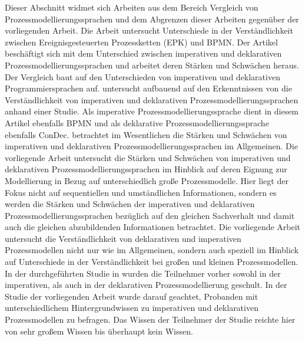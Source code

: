 Dieser Abschnitt widmet sich Arbeiten aus dem Bereich Vergleich von Prozessmodellierungssprachen und dem Abgrenzen dieser Arbeiten gegenüber der vorliegenden Arbeit.
Die Arbeit \cite{recker2007does} untersucht Unterschiede in der Verständlichkeit zwischen Ereignisgesteuerten Prozessketten (EPK) und BPMN.\newline
Der Artikel \cite{fahland2010} beschäftigt sich mit dem Unterschied zwischen imperativen und deklarativen Prozessmodellierungssprachen und arbeitet deren Stärken und Schwächen heraus. Der Vergleich baut auf den Unterschieden von imperativen und deklarativen Programmiersprachen auf. \newline
\cite{pichler2012} untersucht aufbauend auf den Erkenntnissen von  \cite{fahland2010} die Verständlichkeit von imperativen und deklarativen Prozessmodellierungssprachen anhand einer Studie. Als imperative Prozessmodellierungssprache dient in diesem Artikel ebenfalls BPMN und als deklarative Prozessmodellierungssprache ebenfalls ConDec. \newline 
\cite{fahland2010} betrachtet im Wesentlichen die Stärken und Schwächen von imperativen und deklarativen Prozessmodellierungssprachen im Allgemeinen. Die vorliegende Arbeit untersucht die Stärken und Schwächen von imperativen und deklarativen Prozessmodellierungssprachen im Hinblick auf deren Eignung zur Modellierung in Bezug auf unterschiedlich große Prozessmodelle. Hier liegt der Fokus nicht auf sequentiellen und umständlichen Informationen, sondern es werden die Stärken und Schwächen der imperativen und deklarativen Prozessmodellierungssprachen bezüglich auf den gleichen Sachverhalt und damit auch die gleichen abzubildenden Informationen betrachtet.\newline
Die vorliegende Arbeit untersucht die Verständlichkeit von deklarativen und imperativen Prozessmodellen nicht nur wie \cite{pichler2012} im Allgemeinen, sondern auch speziell im Hinblick auf Unterschiede in der Verständlichkeit bei großen und kleinen Prozessmodellen. In der durchgeführten Studie in \cite{pichler2012} wurden die Teilnehmer vorher sowohl in der imperativen, als auch in der deklarativen Prozessmodellierung geschult. In der Studie der vorliegenden Arbeit wurde darauf geachtet, Probanden mit unterschiedlichem Hintergrundwissen zu imperativen und deklarativen Prozessmodellen zu befragen. Das Wissen der Teilnehmer der Studie reichte hier von sehr großem Wissen bis überhaupt kein Wissen.\newline

